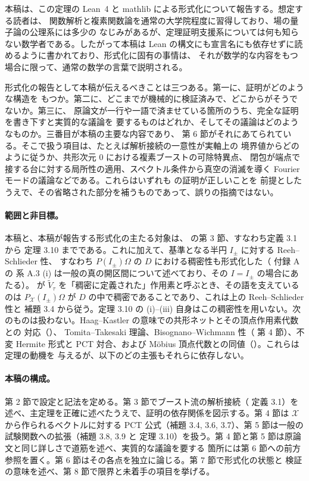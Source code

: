 \documentclass[11pt,a4paper]{article}
\newcommand{\Xcl}{\mathcal{X}}
\newcommand{\Vt}{\widetilde{V}}
\newcommand{\Dom}{D}
\theoremstyle{definition}
\begin{document}
本稿は、この定理の Lean~4 と mathlib による形式化について報告する。想定する読者は、
関数解析と複素関数論を通常の大学院程度に習得しており、場の量子論の公理系には多少の
なじみがあるが、定理証明支援系については何も知らない数学者である。したがって本稿は
Lean の構文にも宣言名にも依存せずに読めるように書かれており、形式化に固有の事情は、
それが数学的な内容をもつ場合に限って、通常の数学の言葉で説明される。

形式化の報告として本稿が伝えるべきことは三つある。第一に、証明がどのような構造を
もつか。第二に、どこまでが機械的に検証済みで、どこからがそうでないか。第三に、
原論文が一行や一語で済ませている箇所のうち、完全な証明を書き下すと実質的な議論を
要するものはどれか、そしてその議論はどのようなものか。三番目が本稿の主要な内容であり、
第 6 節がそれにあてられている。そこで扱う項目は、たとえば解析接続の一意性が実軸上の
境界値からどのように従うか、共形次元 $0$ における複素ブーストの可除特異点、
閉包が端点で接する台に対する局所性の適用、スペクトル条件から真空の消滅を導く
Fourier モードの議論などである。これらはいずれも \cite{T26} の証明が正しいことを
前提としたうえで、その省略された部分を補うものであって、誤りの指摘ではない。

\paragraph{範囲と非目標。}
本稿と、本稿が報告する形式化の主たる対象は、\cite{T26} の第 3 節、すなわち定義 3.1 から
定理 3.10 までである。これに加えて、基準となる半円 $I_\pm$ に対する Reeh--Schlieder 性、
すなわち $P(I_\pm)\Omega$ の $\Dom$ における稠密性も形式化した（\cite{CRTT25} 付録 A の
系 A.3 (i) は一般の真の開区間について述べており、その $I = I_\pm$ の場合にあたる）。
\cite{T26} が $\Vt_\tau$ を「稠密に定義された」作用素と呼ぶとき、その語を支えているのは
$P_\Xcl(I_\pm)\Omega$ が $\Dom$ の中で稠密であることであり、これは上の Reeh--Schlieder 性と
補題 3.4 から従う。定理 3.10 の (i)--(iii) 自身はこの稠密性を用いない。次のものは扱わない。Haag--Kastler の意味での共形ネットとその頂点作用素代数との
対応（\cite{CKLW18}）、
Tomita--Takesaki 理論、Bisognano--Wichmann 性（\cite{T26} 第 4 節）、不変 Hermite 形式と
PCT 対合、および M\"obius 頂点代数との同値（\cite{CRTT25}）。これらは定理の動機を
与えるが、以下のどの主張もそれらに依存しない。

\paragraph{本稿の構成。}
第 2 節で設定と記法を定める。第 3 節でブースト流の解析接続（\cite{T26} 定義 3.1）を
述べ、主定理を正確に述べたうえで、証明の依存関係を図示する。第 4 節は $\Xcl$ から作られるベクトルに対する
PCT 公式（補題 3.4, 3.6, 3.7）、第 5 節は一般の試験関数への拡張（補題 3.8, 3.9 と
定理 3.10）を扱う。第 4 節と第 5 節は原論文と同じ詳しさで道筋を述べ、実質的な議論を要する
箇所には第 6 節への前方参照を置く。第 6 節はその各点を独立に論じる。第 7 節で形式化の状態と
検証の意味を述べ、第 8 節で限界と未着手の項目を挙げる。
\end{document}
